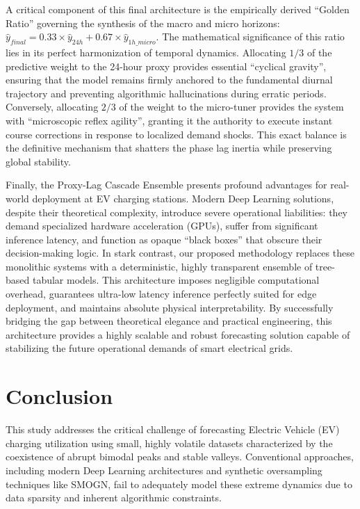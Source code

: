 \documentclass[pdflatex,sn-mathphys-num]{sn-jnl}%
\theoremstyle{thmstyleone}%
\theoremstyle{thmstyletwo}%
\theoremstyle{thmstylethree}%
\begin{document}
A critical component of this final architecture is the empirically derived ``Golden Ratio'' governing the synthesis of the macro and micro horizons: $\hat{y}_{final} = 0.33 \times \hat{y}_{24h} + 0.67 \times \hat{y}_{1h\_micro}$. The mathematical significance of this ratio lies in its perfect harmonization of temporal dynamics. Allocating $1/3$ of the predictive weight to the 24-hour proxy provides essential ``cyclical gravity'', ensuring that the model remains firmly anchored to the fundamental diurnal trajectory and preventing algorithmic hallucinations during erratic periods. Conversely, allocating $2/3$ of the weight to the micro-tuner provides the system with ``microscopic reflex agility'', granting it the authority to execute instant course corrections in response to localized demand shocks. This exact balance is the definitive mechanism that shatters the phase lag inertia while preserving global stability.

Finally, the Proxy-Lag Cascade Ensemble presents profound advantages for real-world deployment at EV charging stations. Modern Deep Learning solutions, despite their theoretical complexity, introduce severe operational liabilities: they demand specialized hardware acceleration (GPUs), suffer from significant inference latency, and function as opaque ``black boxes'' that obscure their decision-making logic. In stark contrast, our proposed methodology replaces these monolithic systems with a deterministic, highly transparent ensemble of tree-based tabular models. This architecture imposes negligible computational overhead, guarantees ultra-low latency inference perfectly suited for edge deployment, and maintains absolute physical interpretability. By successfully bridging the gap between theoretical elegance and practical engineering, this architecture provides a highly scalable and robust forecasting solution capable of stabilizing the future operational demands of smart electrical grids.

\section{Conclusion}\label{sec4}
This study addresses the critical challenge of forecasting Electric Vehicle (EV) charging utilization using small, highly volatile datasets characterized by the coexistence of abrupt bimodal peaks and stable valleys. Conventional approaches, including modern Deep Learning architectures and synthetic oversampling techniques like SMOGN, fail to adequately model these extreme dynamics due to data sparsity and inherent algorithmic constraints. 
\end{document}
